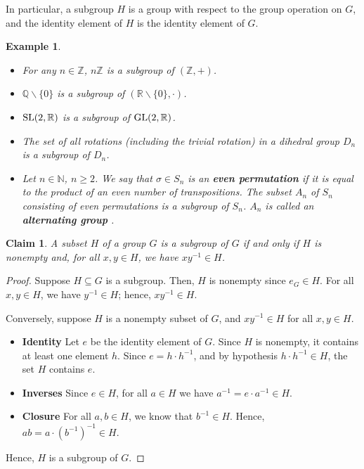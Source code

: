 \documentclass[a4paper,12pt]{report}
\newcommand{\bs}{\backslash}
\newcounter{statement}
\numberwithin{statement}{chapter}
\newtheorem{claim}[statement]{Claim}
\newtheorem{eg}[statement]{\bf Example}
\numberwithin{equation}{chapter}
\numberwithin{section}{chapter}
\numberwithin{subsection}{section}
\begin{document}
In particular, a subgroup $H$ is a group with respect to the group operation on $G$,
and the identity element of $H$ is the identity element of $G$.





\begin{eg}
\label{eg:subgroups}


\begin{itemize}
\item 
For any $n \in \mathbb{Z}$,
$n\mathbb{Z}$ is a subgroup of $(\mathbb{Z}, +)$.

\item 
$\mathbb{Q}\bs\{0\}$ is a subgroup of $(\mathbb{R}\bs\{0\}, \cdot)$.

\item 
${\rm SL}(2, \mathbb{R})$ is a subgroup of ${\rm GL}(2, \mathbb{R})$.

\item 
The set of all rotations (including the trivial rotation) in a dihedral group $D_n$
is a subgroup of $D_n$.

\item 
Let $n \in \mathbb{N}$, $n \geq 2$.  
We say that $\sigma \in S_n$ is an  {\bf even permutation} 
if it is equal to the product of an even number of transpositions.
The subset $A_n$ of $S_n$ consisting of even permutations is a subgroup of $S_n$.
$A_n$ is called an  {\bf alternating group} .
\end{itemize}
\end{eg}

\begin{claim}
A subset $H$ of a group $G$ is a subgroup of $G$ if and only if $H$ is nonempty
and, for all $x, y \in H$, we have $xy^{-1} \in H$.
\end{claim}
\begin{proof}

Suppose $H \subseteq G$ is a subgroup.
Then, $H$ is nonempty since $e_G \in H$.
For all $x, y \in H$, we have $y^{-1} \in H$;
hence, $xy^{-1} \in H$.



Conversely, suppose $H$ is a nonempty subset of $G$,
and $xy^{-1} \in H$ for all $x, y \in H$.




\begin{itemize}
\item 
 {\bf Identity}  Let $e$ be the identity element of $G$.
Since $H$ is nonempty, it contains at least one element $h$.
Since $e = h \cdot h^{-1}$, and by hypothesis $h\cdot h^{-1} \in H$, the set $H$ contains $e$.

\item 
 {\bf Inverses} 
Since $e \in H$, for all $a \in H$ we have $a^{-1} = e\cdot a^{-1} \in H$.

\item 
 {\bf Closure} 
For all $a, b \in H$, we know that $b^{-1} \in H$.  Hence,
$ab = a\cdot(b^{-1})^{-1} \in H$.
\end{itemize}

Hence, $H$ is a subgroup of $G$.


\end{proof}
\end{document}

